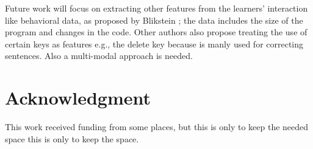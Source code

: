 \documentclass[a4paper]{llncs}
\begin{document}
Future work will focus on extracting other features from the learners'  interaction
like behavioral data, as proposed by Blikstein \cite{blikstein2011using} ; the data includes the size
of the program and changes in the code. Other authors also propose treating the use
of certain keys as features e.g., the delete key because is manly used for correcting
sentences. Also a multi-modal approach is needed. 

\section*{Acknowledgment} This work received funding from some places, but this is 
only to keep the needed space this is only to keep the space.




  




 
 
\end{document}
